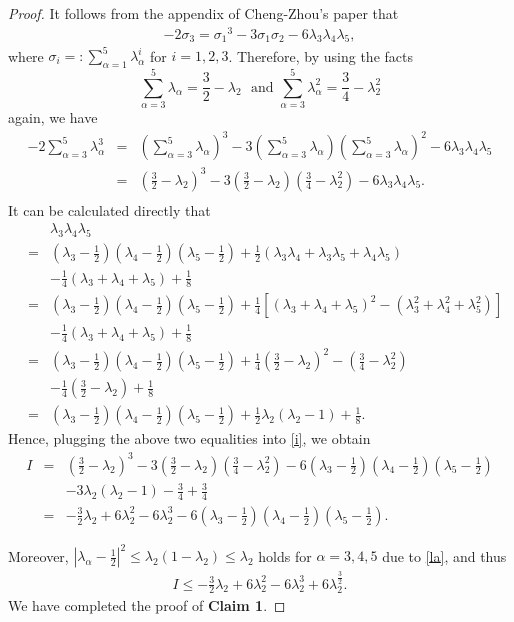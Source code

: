 \documentclass[12pt]{amsart}
\newcommand{\ban}{\begin{eqnarray*}}
\newcommand{\ean}{\end{eqnarray*}}
\begin{document}
\begin{proof}
		\smallskip
		It follows from the appendix of Cheng-Zhou's paper \cite{Cheng-Zhou} that
		\ban
		-2\sigma_3={\sigma_1}^3-3\sigma_1\sigma_2-6\lambda_3\lambda_4\lambda_5,
		\ean
		where
		$\sigma_i=:\sum_{\alpha=1}^5\lambda_{\alpha}^i$ for $i=1,2,3$.
		Therefore, by using the facts
		$$\sum_{\alpha=3}^5\lambda_\alpha=\frac{3}{2}-\lambda_2\,\,\text{ and} \,\, \sum_{\alpha=3}^5\lambda_\alpha^2=\frac{3}{4}-\lambda_2^2$$ again, we have
		\ban
		-2\sum_{\alpha=3}^5\lambda_{\alpha}^3
		&=&\left( \sum_{\alpha=3}^5\lambda_{\alpha}\right)^3-3\left( \sum_{\alpha=3}^5\lambda_{\alpha}\right) \left( \sum_{\alpha=3}^5\lambda_{\alpha}\right)^2-6\lambda_3\lambda_4\lambda_5\\
		&=&(\frac{3}{2}-\lambda_2)^3-3(\frac{3}{2}-\lambda_2)(\frac{3}{4}-\lambda_2^2)-6\lambda_3\lambda_4\lambda_5.\\
		\ean
		It can be calculated directly that
		\ban
		&&\lambda_3\lambda_4\lambda_5\\
		 &=&(\lambda_{3}-\frac{1}{2})(\lambda_{4}-\frac{1}{2})(\lambda_{5}-\frac{1}{2})+\frac{1}{2}(\lambda_3\lambda_4+\lambda_3\lambda_5+\lambda_4\lambda_5)\\
		&&-\frac{1}{4} (\lambda_3+\lambda_4+\lambda_5)+\frac{1}{8}\\
		&=&(\lambda_{3}-\frac{1}{2})(\lambda_{4}-\frac{1}{2})(\lambda_{5}-\frac{1}{2})+
		\frac{1}{4}\left[ (\lambda_3+\lambda_4+\lambda_5)^2- (\lambda_3^2+\lambda_4^2+\lambda_5^2)\right] \\
		&&-\frac{1}{4} (\lambda_3+\lambda_4+\lambda_5)+\frac{1}{8}\\
		&=&(\lambda_{3}-\frac{1}{2})(\lambda_{4}-\frac{1}{2})(\lambda_{5}-\frac{1}{2})
		+\frac{1}{4}(\frac{3}{2}-\lambda_2)^2-(\frac{3}{4}-\lambda_2^2)\\
		&&-\frac{1}{4} (\frac{3}{2}-\lambda_2)+\frac{1}{8}\\
		&=&(\lambda_{3}-\frac{1}{2})(\lambda_{4}-\frac{1}{2})(\lambda_{5}-\frac{1}{2})
		+\frac{1}{2}\lambda_2(\lambda_2-1)+\frac{1}{8}.
		\ean
		Hence, plugging the above two equalities into \eqref{i}, we obtain
		\ban
		I&=&(\frac{3}{2}-\lambda_2)^3-3(\frac{3}{2}-\lambda_2)(\frac{3}{4}-\lambda_2^2)
		-6(\lambda_{3}-\frac{1}{2})(\lambda_{4}-\frac{1}{2})(\lambda_{5}-\frac{1}{2})\\
		&&-3\lambda_2(\lambda_2-1)-\frac{3}{4}+\frac{3}{4}\\
		&=&-\frac{3}{2}\lambda_2+6\lambda_2^2-6\lambda_2^3-6(\lambda_{3}-\frac{1}{2})(\lambda_{4}-\frac{1}{2})(\lambda_{5}-\frac{1}{2}).
		\ean
		
		Moreover, $|\lambda_{\alpha}-\frac{1}{2}|^2 \leq\lambda_2(1-\lambda_2)\leq\lambda_2$ holds for $\alpha=3,4,5$ due to \eqref{la}, and thus
		\ban
		I\leq-\frac{3}{2}\lambda_2+6\lambda_2^2-6\lambda_2^3+6\lambda_2^{\frac{3}{2}}.
		\ean
		We have completed the proof of \textbf{Claim 1}.
		

\end{proof}
\end{document}
